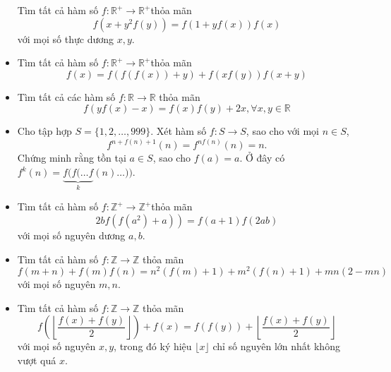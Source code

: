\documentclass[11pt]{scrartcl}
\begin{document}
\begin{itemize}[label=, leftmargin=0em, itemsep=-0em]
\begin{btvn}
        Tìm tất cả hàm số $f: \mathbb{R}^{+} \rightarrow \mathbb{R}^{+}$thỏa mãn
        $$
        f\left(x+y^2 f(y)\right)=f(1+y f(x)) f(x)
        $$
        với mọi số thực dương $x, y$.
   \end{btvn}
   \item \begin{btvn}
     Tìm tất cả hàm số $f: \mathbb{R}^{+} \rightarrow \mathbb{R}^{+}$thỏa mãn
    $$
    f(x)=f(f(f(x))+y)+f(x f(y)) f(x+y)
    $$
\end{btvn}
    \item \begin{btvn}
        Tìm tất cả các hàm số $f: \mathbb{R}\rightarrow \mathbb{R}$ thỏa mãn
        \[f(yf(x)-x)=f(x)f(y)+2x, \forall x,y \in \mathbb{R}\]
    \end{btvn}

    \item \begin{btvn}
        Cho tập hợp $S=\{1,2,\ldots ,999\}$. Xét hàm số $f: S\to S$, sao cho với mọi $n\in S$,
        $$f^{n+f(n)+1}(n)=f^{nf(n)}(n)=n.$$
        Chứng minh rằng tồn tại $a\in S$, sao cho $f(a)=a$. Ở đây có $f^k(n) = \underbrace{f(f(\ldots f}_{k}(n)\ldots))$.
    \end{btvn}
    \item \begin{btvn}
        Tìm tất cả hàm số $f: \mathbb{Z}^{+} \rightarrow \mathbb{Z}^{+}$thỏa mãn
        $$
        \left.2 b f\left(f\left(a^2\right)+a\right)\right)=f(a+1) f(2 a b)
        $$
        với mọi số nguyên dương $a, b$.
    \end{btvn}
    \item \begin{btvn}
         Tìm tất cả hàm số $f: \mathbb{Z} \rightarrow \mathbb{Z}$ thỏa mãn
            $$
            f(m+n)+f(m) f(n)=n^2(f(m)+1)+m^2(f(n)+1)+m n(2-m n)
            $$
            với mọi số nguyên $m, n$.
    \end{btvn}
    \item \begin{btvn}
         Tìm tất cả hàm số $f: \mathbb{Z} \rightarrow \mathbb{Z}$ thỏa mãn
        $$
        f\left(\left\lfloor\frac{f(x)+f(y)}{2}\right\rfloor\right)+f(x)=f(f(y))+\left\lfloor\frac{f(x)+f(y)}{2}\right\rfloor
        $$
        với mọi số nguyên $x, y$, trong đó ký hiệu $\lfloor x\rfloor$ chỉ số nguyên lớn nhất không vượt quá $x$.
    \end{btvn}


\end{itemize}
\end{document}
